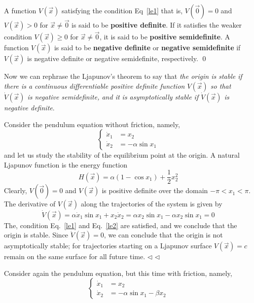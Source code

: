 \documentclass[12pt,a4paper,oneside]{book}
\begin{document}
\begin{onehalfspace}
\begin{defn}
	A function $V(\vec{x})$ satisfying the condition Eq~\ref{le1} that is, 
	$V(\vec{0})=0$ and $V(\vec{x})>0$ for $\vec{x}\ne\vec{0}$ is said to be 
	\textbf{positive definite}. If it satisfies the weaker condition 
	$V(\vec{x})\ge0$ for $\vec{x}\ne\vec{0}$, it is said to be \textbf{positive 
	semidefinite}. A function $V(\vec{x})$ is said to be \textbf{negative 
	definite} or \textbf{negative semidefinite} if $V(\vec{x})$ is negative 
	definite or negative semidefinite, respectively.
	\qed
\end{defn}
Now we can rephrase the Ljapunov's theorem to say that \textit{the origin is 
stable if there is a continuous differentiable positive definite function 
$V(\vec{x})$ so that $\dot{V}(\vec{x})$ is negative semidefinite, and it is 
asymptotically stable if $\dot{V}(\vec{x})$ is negative definite}.

\begin{example}
	Consider the pendulum equation without friction, namely,
	\begin{equation*}
		\left\lbrace \begin{aligned}
			\dot{x}_1 &=  x_2 \\[6pt] 
			\dot{x}_2 &= -\alpha\sin x_1
		\end{aligned}\right. 
	\end{equation*}
	and let us study the stability of the equilibrium point at the origin. A 
	natural Ljapunov function is the energy function 
	\begin{equation*}
		H(\vec{x}) = \alpha(1-\cos x_1) + \frac{1}{2}x_2^2 
	\end{equation*}
	Clearly, $V(\vec{0})=0$ and $V(\vec{x})$ is positive definite over the 
	domain $-\pi<x_1<\pi$. The derivative of $V(\vec{x})$ along the 
	trajectories of the system is given by
	\begin{equation*}
		\dot{V}(\vec{x})=\alpha\dot{x}_1\sin x_1+x_2\dot{x}_2 = \alpha x_2\sin 
		x_1-\alpha x_2\sin x_1=0
	\end{equation*}
	The, condition Eq.~\eqref{le1} and Eq.~\eqref{le2} are satisfied, and we 
	conclude that the origin is stable. Since $\dot{V}(\vec{x})=0$, we can 
	conclude that the origin is not asymptotically stable; for trajectories 
	starting on a Ljapunov surface $V(\vec{x})=c$ remain on the same surface 
	for all future time. 
	$\triangleleft$
$\triangleleft$ \end{example}

\begin{example} 
	Consider again the pendulum equation, but this time with friction, namely, 
	\begin{equation*}
		\left\lbrace \begin{aligned}
			\dot{x}_1 &=  x_2 \\[6pt] 
			\dot{x}_2 &= -\alpha\sin x_1 -\beta x_2
		\end{aligned}\right. 
	\end{equation*}
	

\end{example}
\end{onehalfspace}
\end{document}

